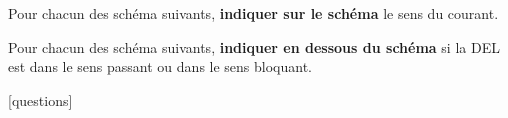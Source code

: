 \documentclass[11pt]{exam}		%
\begin{document}
\begin{questions}
	\begin{figure*}[hb]
		\centering
			\hspace{180pt}
	\end{figure*}
		



	\question[4]
	Pour chacun des schéma suivants, \textbf{indiquer sur le schéma} le sens du courant.

	\begin{figure*}[hb]
		\centering
			\hspace{20pt}
			\hspace{20pt}
			\hspace{20pt}
	\end{figure*}
		



	\question[2]
	Pour chacun des schéma suivants, \textbf{indiquer en dessous du schéma} 
	si la DEL est dans le sens passant ou dans le sens bloquant.

	\begin{figure*}[hb]
		\centering
			\hspace{180pt}
	\end{figure*}
		




\end{questions}


\vfill
\begin{center}
\setlength{\doublerulesep}{0.25in}
[questions]
\end{center}
\end{document}
